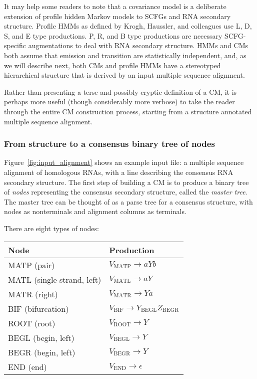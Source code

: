 \documentclass[11pt]{article}
\begin{document}
It may help some readers to note that a covariance model is a
deliberate extension of profile hidden Markov models to SCFGs and RNA
secondary structure. Profile HMMs as defined by Krogh, Haussler, and
colleagues use L, D, S, and E type productions. P, R, and B type
productions are necessary SCFG-specific augmentations to deal with RNA
secondary structure. HMMs and CMs both assume that emission and
transition are statistically independent, and, as we will describe
next, both CMs and profile HMMs have a stereotyped hierarchical
structure that is derived by an input multiple sequence alignment.

Rather than presenting a terse and possibly cryptic definition of a
CM, it is perhaps more useful (though considerably more verbose) to
take the reader through the entire CM construction process, starting
from a structure annotated multiple sequence alignment.

\subsubsection{From structure to a consensus binary tree of nodes}

Figure~\ref{fig:input_alignment} shows an example input file: a
multiple sequence alignment of homologous RNAs, with a line describing
the consensus RNA secondary structure. The first step of building a CM
is to produce a binary tree of \emph{nodes} representing the consensus
secondary structure, called the \emph{master tree}. The master tree
can be thought of as a parse tree for a consensus structure, with
nodes as nonterminals and alignment columns as terminals.

There are eight types of nodes:

\begin{tabular}{ll}
Node                         &  Production           \\ \hline
MATP  (pair)                 & $V_{\mbox{MATP}} \rightarrow a Y b$  \\
MATL  (single strand, left)  & $V_{\mbox{MATL}} \rightarrow a Y$   \\
MATR  (right)                & $V_{\mbox{MATR}} \rightarrow Y a$   \\
BIF   (bifurcation)          & $V_{\mbox{BIF}}  \rightarrow Y_{\mbox{BEGL}} Z_{\mbox{BEGR}}$ \\
ROOT  (root)                 & $V_{\mbox{ROOT}} \rightarrow Y$       \\
BEGL  (begin, left)          & $V_{\mbox{BEGL}} \rightarrow Y$       \\
BEGR  (begin, left)          & $V_{\mbox{BEGR}} \rightarrow Y$       \\
END   (end)                  & $V_{\mbox{END}}  \rightarrow \epsilon$ \\ \hline
\end{tabular}
 
\end{document}
